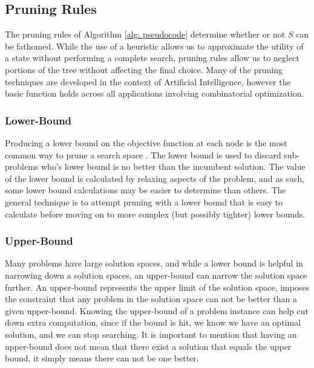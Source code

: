 
\subsection{Pruning Rules}
	The pruning rules of Algorithm \ref{alg: pseudocode} determine whether or not $S$ can be fathomed.
	While the use of a heuristic allows us to approximate the utility of a state without performing a complete search, pruning rules allow us to neglect portions of the tree without affecting the final choice. 
	Many of the pruning techniques are developed in the context of Artificial Intelligence, however the basic function holds across all applications involving combinatorial optimization. 
	\subsubsection{Lower-Bound}
		Producing a lower bound on the objective function at each node is the most common way to prune a search space \cite{morrison2016branch}. 
		The lower bound is used to discard sub-problems who's lower bound is no better than the incumbent solution. 
		The value of the lower bound is calculated by relaxing aspects of the problem, and as such, some lower bound calculations may be easier to determine than others. 
		The general technique is to attempt pruning with a lower bound that is easy to calculate before moving on to more complex (but possibly tighter) lower bounds. 
	\subsubsection{Upper-Bound}
		Many problems have large solution spaces, and while a lower bound is helpful in narrowing
		down a solution spaces, an upper-bound can narrow the solution space further.
		An upper-bound represents the upper limit of the solution space, imposes the constraint that any
		problem in the solution space can not be better than a given upper-bound.
		Knowing the upper-bound of a problem instance can help cut down extra computation,
		since if the bound is hit, we know we have an optimal solution, and we can stop
		searching. It is important to mention that having an upper-bound does not 
		mean that there exist a solution that equals the upper bound, it simply means 
		there can not be one better.
		
